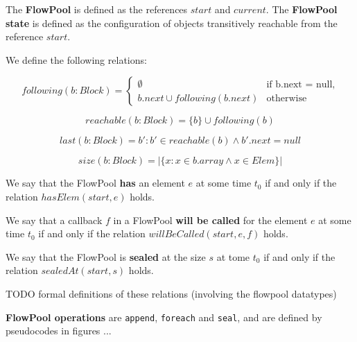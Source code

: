 \documentclass[runningheads,a4paper]{llncs}
\begin{document}
\begin{definition}[FlowPool]
The \textbf{FlowPool} is defined as the references $start$ and $current$.
The \textbf{FlowPool state} is defined as the configuration of objects transitively reachable from the reference $start$.

We define the following relations:

\begin{equation*}
following(b: Block) = 
\begin{cases}
\emptyset & \text{if b.next = null,}
\\
b.next \cup following(b.next) & \text{otherwise}
\end{cases}
\end{equation*}

\begin{equation*}
reachable(b: Block) = \{ b \} \cup following(b)
\end{equation*}

\begin{equation*}
last(b: Block) = b' : b' \in reachable(b) \wedge b'.next = null
\end{equation*}

\begin{equation*}
size(b: Block) = | \{ x : x \in b.array \wedge x \in Elem \} |
\end{equation*}

We say that the FlowPool \textbf{has} an element $e$ at some time $t_0$ if and only if the relation $hasElem(start, e)$ holds.

We say that a callback $f$ in a FlowPool \textbf{will be called} for the element $e$ at some time $t_0$ if and only if the relation $willBeCalled(start, e, f)$ holds.

We say that the FlowPool is \textbf{sealed} at the size $s$ at tome $t_0$ if and only if the relation $sealedAt(start, s)$ holds.

TODO formal definitions of these relations (involving the flowpool datatypes)

\textbf{FlowPool operations} are \verb=append=, \verb=foreach= and \verb=seal=, and are defined by pseudocodes in figures ...
\end{definition}
\end{document}
